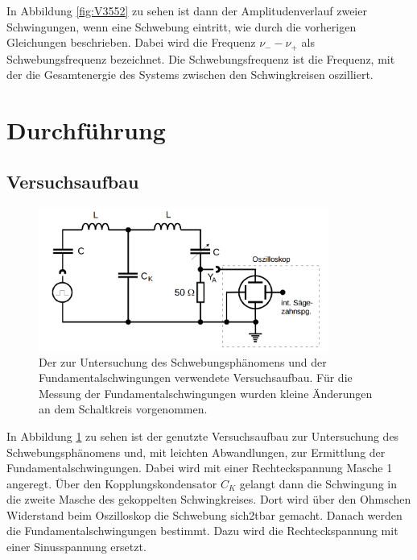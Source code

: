 \documentclass[
  bibliography=totoc,     %
  captions=tableheading,  %
  titlepage=firstiscover, %
]{scrartcl}
\begin{document}
In Abbildung \ref{fig:V3552} zu sehen ist dann der Amplitudenverlauf zweier
Schwingungen, wenn eine Schwebung eintritt, wie durch die vorherigen Gleichungen
beschrieben. Dabei wird die Frequenz $\nu_--\nu_+$ als Schwebungsfrequenz
bezeichnet. Die Schwebungsfrequenz ist die Frequenz, mit der die Gesamtenergie
des Systems zwischen den Schwingkreisen oszilliert.
\section{Durchführung}
\label{sec:durchführung}

\subsection{Versuchsaufbau}
\label{sec:versuchsaufbau}
\begin{figure}[htb]
  \centering
  \includegraphics[width=0.85\textwidth]{V3554.png}
  \caption{Der zur Untersuchung des Schwebungsphänomens und der Fundamentalschwingungen verwendete Versuchsaufbau. Für die Messung der Fundamentalschwingungen wurden kleine Änderungen an dem Schaltkreis vorgenommen.}
  \label{fig:V3554}
\end{figure}
In Abbildung \ref{fig:V3554} zu sehen ist der genutzte Versuchsaufbau zur
Untersuchung des Schwebungsphänomens und, mit leichten Abwandlungen, zur
Ermittlung der Fundamentalschwingungen. Dabei wird mit einer Rechteckspannung
Masche 1 angeregt. Über den Kopplungskondensator $C_K$ gelangt dann
die Schwingung in die zweite Masche des gekoppelten Schwingkreises. Dort wird
über den Ohmschen Widerstand beim Oszilloskop die Schwebung sich2tbar gemacht.
Danach werden die Fundamentalschwingungen bestimmt. Dazu wird die Rechteckspannung
mit einer Sinusspannung ersetzt.
\end{document}
